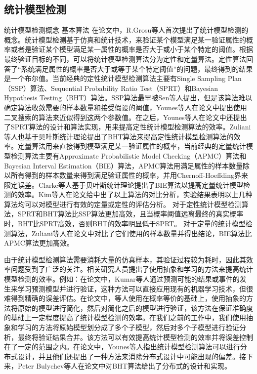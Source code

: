 \subsection{统计模型检测}
统计模型检测概念 基本算法
在论文\cite{Grosu2005Monte}中，R.Grosu等人首次提出了统计模型检测的概念。统计模型检测基于仿真和统计技术，来验证某个模型满足某一验证属性的概率或者是验证某个模型满足某一属性的概率是否大于或小于某个特定的阈值。根据最终验证目标的不同，可以将统计模型检测算法分为定性和定量算法。定性算法回答了“系统满足属性的概率是否大于或等于某个特定阈值”的问题，最终得到的结果是一个布尔值。当前经典的定性统计模型检测算法主要有Single Sampling Plan（SSP）\cite{sen2004statistical}算法、Sequential Probability Ratio Test（SPRT）\cite{wald1945sequential}和Bayesian Hypothesis Testing（BHT）\cite{zuliani2013bayesian}算法。SSP算法最早被Sen等人提出，但是该算法难以确定算法收敛需要的样本数量和接受假设的阈值，Younes等人在论文\cite{younes2005verification}中提出使用二叉搜索的算法来近似得到这两个参数值。在之后，Younes等人在论文\cite{younes2005verification,younes2006statistical}中还提出了SPRT算法的设计和算法实现，用来提高定性统计模型检测算法的效率。Zuliani等人也基于贝叶斯统计理论提出了BHT算法来提高定性统计模型检测算法的效率。定量算法用来直接得到模型满足某一验证属性的概率，当前经典的定量统计模型检测算法主要有Approximate Probabilistic Model Checking（APMC）\cite{herault2004approximate}算法和Bayesian Interval Estimation（BIE）\cite{jha2009bayesian}算法，APMC算法用满足属性的样本数量除以所有得到的样本数量来得到满足验证属性的概率，并用Chernoff-Hoeffding界来限定误差。Clarke等人基于贝叶斯统计理论提出了BIE算法以提高定量统计模型检测的效率。Kim等人在论文\cite{Kim2012Statistical}给中出了以上算法的对比分析，实验结果表明以上几种算法均可以对模型进行有效的定量或定性的评估分析。 对于定性统计模型检测算法，SPRT和BHT算法比SSP算法更加高效，且当概率阈值远离最终的真实概率时，BHT比SPRT高效，否则BHT的效率明显低于SPRT。 对于定量的统计模型检测算法，Zuliani等人在论文\cite{zuliani2013bayesian}中对比了它们使用的样本数量并得出结论，BIE算法比APMC算法更加高效。

由于统计模型检测算法需要消耗大量的仿真样本，其验证过程较为耗时，因此其效率问题受到了广泛的关注。相关研究人员提出了使用抽象和学习的方法来提高统计模型检测的效率。例如：在论文\cite{Kumar2014Efficient}中，Kumar等人通过预测可能的结果或事件的发生来学习预测模型并进行验证，这种方法可以直接应用现有的机器学习技术，但很难得到精确的误差评估。在论文\cite{Basu2012Statistical}中，等人使用在概率等价的基础上，使用抽象的方法将原始的模型进行简化，然后对简化之后的模型进行验证，该方法在保证准确度的基础上一定程度提高了统计模型检测的效率。在我们之前的工作\cite{jiangkaiqiang2016}中，我们使用抽象和学习的方法将原始模型划分成了多个子模型，然后对多个子模型进行验证分析，最终将验证结果合并。该方法可以有效提高统计模型检测的效率并将误差控制在了一定的范围之内。在论文\cite{younes2005ymer}中，Younes等人指出统计模型检测算法可以进行分布式设计，并且他们还提出了一种方法来消除分布式设计中可能出现的偏差。接下来，Peter Bulychev等人在论文\cite{Bulychev2012Checking}中对BHT算法给出了分布式的设计和实现。

